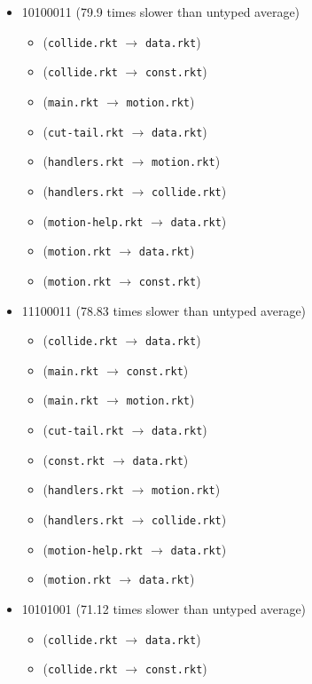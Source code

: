 \documentclass{article}
\newcommand{\mono}[1]{\texttt{#1}}
\begin{document}
\begin{itemize}
\begin{itemize}
  \end{itemize}
\item 10100011 (79.9 times slower than untyped average)
  \begin{itemize}
  \item (\mono{collide.rkt} $\rightarrow$ \mono{data.rkt})
  \item (\mono{collide.rkt} $\rightarrow$ \mono{const.rkt})
  \item (\mono{main.rkt} $\rightarrow$ \mono{motion.rkt})
  \item (\mono{cut-tail.rkt} $\rightarrow$ \mono{data.rkt})
  \item (\mono{handlers.rkt} $\rightarrow$ \mono{motion.rkt})
  \item (\mono{handlers.rkt} $\rightarrow$ \mono{collide.rkt})
  \item (\mono{motion-help.rkt} $\rightarrow$ \mono{data.rkt})
  \item (\mono{motion.rkt} $\rightarrow$ \mono{data.rkt})
  \item (\mono{motion.rkt} $\rightarrow$ \mono{const.rkt})
  \end{itemize}
\item 11100011 (78.83 times slower than untyped average)
  \begin{itemize}
  \item (\mono{collide.rkt} $\rightarrow$ \mono{data.rkt})
  \item (\mono{main.rkt} $\rightarrow$ \mono{const.rkt})
  \item (\mono{main.rkt} $\rightarrow$ \mono{motion.rkt})
  \item (\mono{cut-tail.rkt} $\rightarrow$ \mono{data.rkt})
  \item (\mono{const.rkt} $\rightarrow$ \mono{data.rkt})
  \item (\mono{handlers.rkt} $\rightarrow$ \mono{motion.rkt})
  \item (\mono{handlers.rkt} $\rightarrow$ \mono{collide.rkt})
  \item (\mono{motion-help.rkt} $\rightarrow$ \mono{data.rkt})
  \item (\mono{motion.rkt} $\rightarrow$ \mono{data.rkt})
  \end{itemize}
\item 10101001 (71.12 times slower than untyped average)
  \begin{itemize}
  \item (\mono{collide.rkt} $\rightarrow$ \mono{data.rkt})
  \item (\mono{collide.rkt} $\rightarrow$ \mono{const.rkt})

\end{itemize}
\end{itemize}
\end{document}
